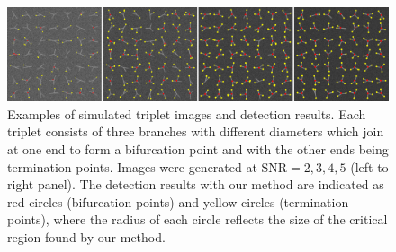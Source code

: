 \begin{figure}[!t]
	\centering
	\includegraphics[width=\columnwidth]{triplets-snr-2345}
	\caption{Examples of simulated triplet images and detection results. Each triplet consists of three branches with different diameters which join at one end to form a bifurcation point and with the other ends being termination points. Images were generated at $\textrm{SNR}=2,3,4,5$ (left to right panel). The detection results with our method are indicated as red circles (bifurcation points) and yellow circles (termination points), where the radius of each circle reflects the size of the critical region found by our method.} %
	\label{fig:tiplet-images}
\end{figure}

